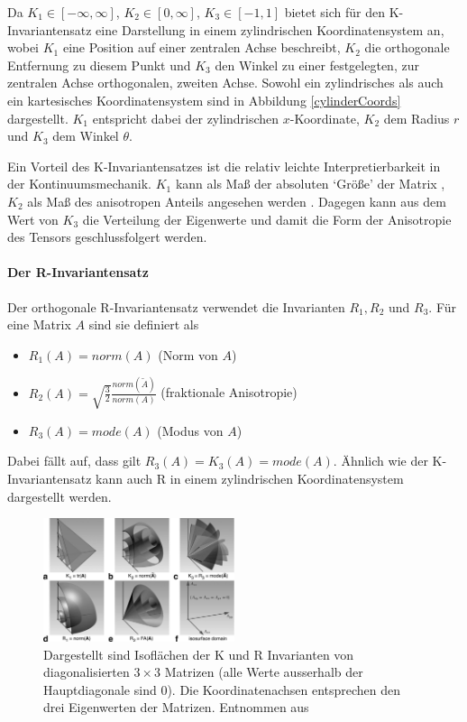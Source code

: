 \documentclass[a4paper,fontsize=12pt,toc=bib,halfparskip]{scrartcl}
\begin{document}
Da $K_1 \in [-\infty, \infty]$, $K_2 \in [0,\infty]$, $K_3 \in [-1,1]$ bietet sich f\"ur den K-Invariantensatz eine Darstellung in einem zylindrischen Koordinatensystem an, wobei $K_1$ eine Position auf einer zentralen Achse beschreibt, $K_2$ die orthogonale Entfernung zu diesem Punkt und $K_3$ den Winkel zu einer festgelegten, zur zentralen Achse orthogonalen, zweiten Achse. Sowohl ein zylindrisches als auch ein kartesisches Koordinatensystem sind in Abbildung \ref{cylinderCoords} dargestellt. $K_1$ entspricht dabei der zylindrischen $x$-Koordinate, $K_2$ dem Radius $r$ und $K_3$ dem Winkel $\theta$.

Ein Vorteil des K-Invariantensatzes ist die relativ leichte Interpretierbarkeit in der Kontinuumsmechanik. $K_1$ kann als Ma{\ss} der absoluten `Gr\"o{\ss}e' der Matrix , $K_2$ als Ma{\ss} des anisotropen Anteils angesehen werden \cite{kindlmann2007diffusion}. Dagegen kann aus dem Wert von $K_3$ die Verteilung der Eigenwerte und damit die Form der Anisotropie des Tensors geschlussfolgert werden.



\paragraph{Der R-Invariantensatz}
Der orthogonale R-Invariantensatz verwendet die Invarianten $R_1, R_2$ und $R_3$. F\"ur eine Matrix $A$ sind sie definiert als

\begin{itemize}
	\item $R_1(A)=norm(A)$ (Norm von $A$)
	\item $R_2(A)=\sqrt{\frac{3}{2}} \frac{norm(\tilde{A})}{norm(A)}$ (fraktionale Anisotropie)
	\item $R_3(A)=mode(A)$ (Modus von $A$)
\end{itemize}

Dabei f\"allt auf, dass gilt $R_3(A) = K_3(A) = mode(A)$. \"Ahnlich wie der K-Invariantensatz kann auch R in einem zylindrischen Koordinatensystem dargestellt werden.

\begin{figure}
	\centering
	\includegraphics[width=0.5\textwidth]{pictures/000.png}
	\caption{Dargestellt sind Isofl\"achen der K und R Invarianten von diagonalisierten $3\times 3$ Matrizen (alle Werte ausserhalb der Hauptdiagonale sind 0). Die Koordinatenachsen entsprechen den drei Eigenwerten der Matrizen. Entnommen aus \cite[S.~139]{ennis2006orthogonal}}
	\label{KRInvariants}
\end{figure}
\end{document}
